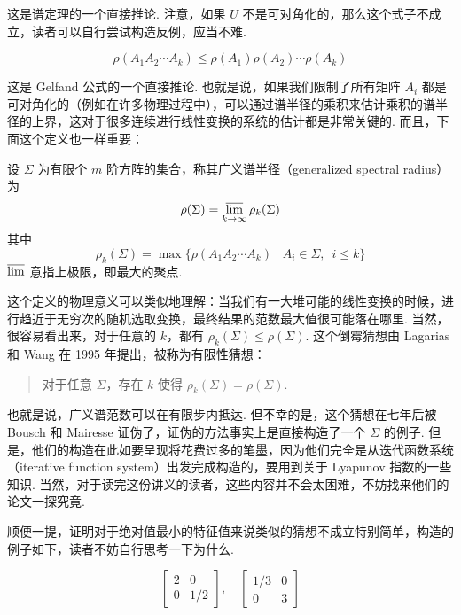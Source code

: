 这是谱定理的一个直接推论. 注意，如果 $U$ 不是可对角化的，那么这个式子不成立，读者可以自行尝试构造反例，应当不难.

\begin{theorem}
    \[
    \rho(A_1A_2\cdots A_k) \leqslant \rho(A_1)\rho(A_2)\cdots \rho(A_k)
    \]
\end{theorem}

这是 Gelfand 公式的一个直接推论. 也就是说，如果我们限制了所有矩阵 $A_i$ 都是可对角化的（例如在许多物理过程中），可以通过谱半径的乘积来估计乘积的谱半径的上界，这对于很多连续进行线性变换的系统的估计都是非常关键的. 而且，下面这个定义也一样重要：

\begin{definition}
    设 $\Sigma$ 为有限个 $m$ 阶方阵的集合，称其广义谱半径（generalized spectral radius）为
    \[
    \rho(\Sigma) = \varlimsup_{k \to \infty} \rho_k(\Sigma)
    \]
    其中
    \[
    \rho_k(\Sigma) = \max\{\rho(A_1A_2 \cdots A_k) \mid A_i \in \Sigma,\enspace i \leqslant k\}
    \]
    $\varlimsup$ 意指上极限，即最大的聚点.
\end{definition}

这个定义的物理意义可以类似地理解：当我们有一大堆可能的线性变换的时候，进行趋近于无穷次的随机选取变换，最终结果的范数最大值很可能落在哪里. 当然，很容易看出来，对于任意的 $k$，都有 $\rho_k(\Sigma) \leqslant \rho(\Sigma)$. 这个倒霉猜想由 Lagarias 和 Wang 在 1995 年提出，被称为有限性猜想：

\begin{quote}
    \kaishu
    对于任意 $\Sigma$，存在 $k$ 使得 $\rho_k(\Sigma) = \rho(\Sigma)$.
\end{quote}

也就是说，广义谱范数可以在有限步内抵达. 但不幸的是，这个猜想在七年后被 Bousch 和 Mairesse 证伪了，证伪的方法事实上是直接构造了一个 $\Sigma$ 的例子. 但是，他们的构造在此如要呈现将花费过多的笔墨，因为他们完全是从迭代函数系统（iterative function system）出发完成构造的，要用到关于 Lyapunov 指数的一些知识. 当然，对于读完这份讲义的读者，这些内容并不会太困难，不妨找来他们的论文一探究竟.

顺便一提，证明对于绝对值最小的特征值来说类似的猜想不成立特别简单，构造的例子如下，读者不妨自行思考一下为什么.

\[
\begin{bmatrix}
2 & 0 \\ 0 & 1/2
\end{bmatrix}, \quad \begin{bmatrix}
1/3 & 0 \\ 0 & 3
\end{bmatrix}
\]

